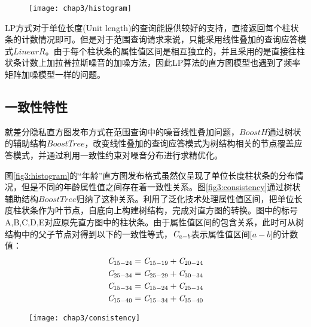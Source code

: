 \begin{figure}[!htp]
	\centering
	\texttt{[image: chap3/histogram]}
\end{figure}

LP方式对于单位长度(Unit length)的查询能提供较好的支持，直接返回每个柱状条的计数情况即可。但是对于范围查询请求来说，只能采用线性叠加的查询应答模式$LinearR$。由于每个柱状条的属性值区间是相互独立的，并且采用的是直接往柱状条计数上加拉普拉斯噪音的加噪方法，因此LP算法的直方图模型也遇到了频率矩阵加噪模型一样的问题。

\subsection{一致性特性}
\label{LP_publish}

就差分隐私直方图发布方式在范围查询中的噪音线性叠加问题，$BoostH$通过树状的辅助结构$BoostTree$，改变线性叠加的查询应答模式为树结构相关的节点覆盖应答模式，并通过利用一致性约束\supercite{privacy-accuracy-consistency}对噪音分布进行求精优化。

图\ref{fig3:histogram}的“年龄”直方图发布格式虽然仅呈现了单位长度柱状条的分布情况，但是不同的年龄属性值之间存在着一致性关系。图\ref{fig3:consistency}通过树状辅助结构$BoostTree$归纳了这种关系。利用了泛化技术处理属性值区间，把单位长度柱状条作为叶节点，自底向上构建树结构，完成对直方图的转换。图中的标号A,B,C,D,E对应原先直方图中的柱状条。由于属性值区间的包含关系，此时可从树结构中的父子节点对得到以下的一致性等式，${\it{C}}_{a-b}$表示属性值区间[$a-b$]的计数值：
\begin{equation}
\label{consistent_equal}
\begin{split}
&{\it{C}}_{15-24} = {\it{C}}_{15-19}+{\it{C}}_{20-24}\\
&{\it{C}}_{25-34} = {\it{C}}_{25-29}+{\it{C}}_{30-34}\\
&{\it{C}}_{15-34} = {\it{C}}_{15-24}+{\it{C}}_{25-34}\\
&{\it{C}}_{15-40} = {\it{C}}_{15-34}+{\it{C}}_{35-40}
\end{split}
\end{equation}

\begin{figure}[!htp]
	\centering
	\texttt{[image: chap3/consistency]}
\end{figure}

